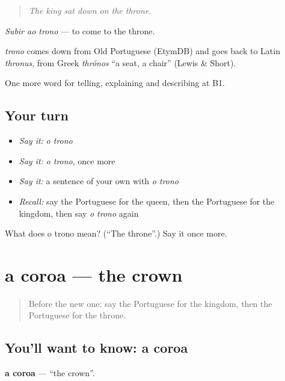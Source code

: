 \begin{quote}
\emph{The king sat down on the throne.}
\end{quote}

\emph{Subir ao trono} — to come to the throne.

\begin{cousinweb}
\emph{trono} comes down from Old Portuguese (EtymDB) and goes back to Latin \emph{thronus}, from Greek \emph{thrónos} \textquotedblleft{}a seat, a chair\textquotedblright{} (Lewis \& Short).
\end{cousinweb}

\begin{grammarlens}[title={What you've built}]
One more word for telling, explaining and describing at B1.
\end{grammarlens}

\subsection*{Your turn}
\begin{itemize}
\raggedright
  \item \emph{Say it:} \emph{o trono}
  \item \emph{Say it:} \emph{o trono}, once more
  \item \emph{Say it:} a sentence of your own with \emph{o trono}
  \item \emph{Recall:} say the Portuguese for the queen, then the Portuguese for the kingdom, then say \emph{o trono} again
\end{itemize}

\begin{tcolorbox}[breakable,colback=teal!4,colframe=teal!35!black,title={Before you move on}]
What does o trono mean? (\textquotedblleft{}The throne\textquotedblright{}.) Say it once more.
\end{tcolorbox}
\section[a coroa]{a coroa — the crown}

\label{lesson:PT-C327-coroa}



\begin{quote}
Before the new one: say the Portuguese for the kingdom, then the Portuguese for the throne.
\end{quote}

\subsection*{You'll want to know: a coroa}
\textbf{a coroa} — \textquotedblleft{}the crown\textquotedblright{}.

